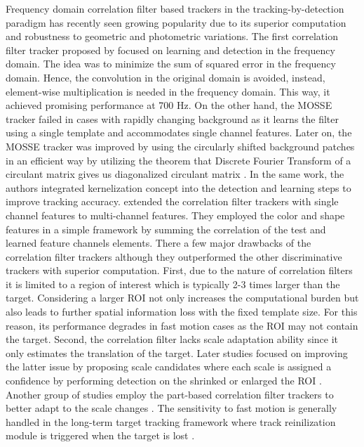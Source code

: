 \documentclass[10pt,twocolumn,letterpaper]{article}
\begin{document}
Frequency domain correlation filter based trackers in the
tracking-by-detection paradigm has recently seen growing popularity
due to its superior computation and robustness to geometric and
photometric variations. The first correlation filter tracker proposed
by \cite{bolme2010visual} focused on learning and detection in the
frequency domain. The idea was to minimize the sum of squared error in
the frequency domain. Hence, the convolution in the original domain is
avoided, instead, element-wise multiplication is needed in the
frequency domain. This way, it achieved promising performance at 700
Hz. On the other hand, the MOSSE tracker failed in cases with rapidly
changing background as it learns the filter using a single template
and accommodates single channel features. Later on, the MOSSE tracker
was improved by using the circularly shifted background patches in an
efficient way by utilizing the theorem that Discrete Fourier Transform
of a circulant matrix gives us diagonalized circulant matrix
\cite{henriques2012exploiting,henriques2015high}. In the same work,
the authors integrated kernelization concept into the detection and
learning steps to improve tracking
accuracy. \cite{galoogahi2013multi,henriques2015high} extended the
correlation filter trackers with single channel features to
multi-channel features. They employed the color and shape features in
a simple framework by summing the correlation of the test and learned
feature channels elements. There a few major drawbacks of the
correlation filter trackers although they outperformed the other
discriminative trackers with superior computation. First, due to the
nature of correlation filters it is limited to a region of interest
which is typically 2-3 times larger than the target. Considering a
larger ROI not only increases the computational burden but also leads
to further spatial information loss with the fixed template size. For
this reason, its performance degrades in fast motion cases as the ROI
may not contain the target. Second, the correlation filter lacks scale
adaptation ability since it only estimates the translation of the
target. Later studies focused on improving the latter issue by
proposing scale candidates where each scale is assigned a confidence
by performing detection on the shrinked or enlarged the ROI
\cite{li2014scale,tang2015multi,bibi2015multi,ma2015long}. Another
group of studies employ the part-based correlation filter trackers to
better adapt to the scale changes
\cite{liu2015real,akin2016deformable}. The sensitivity to fast motion
is generally handled in the long-term target tracking framework where
track reinilization module is triggered when the target is lost
\cite{ma2015long,de2015board,li2016monocular}.
\end{document}
